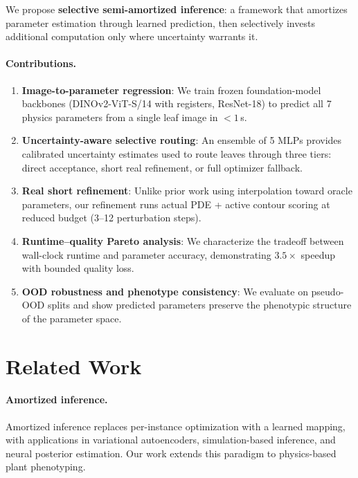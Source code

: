 \documentclass[11pt,a4paper]{article}
\begin{document}
We propose \textbf{selective semi-amortized inference}:
a framework that amortizes parameter estimation through learned prediction,
then selectively invests additional computation only where uncertainty warrants it.

\paragraph{Contributions.}
\begin{enumerate}
\item \textbf{Image-to-parameter regression}: We train frozen foundation-model
  backbones (DINOv2-ViT-S/14 with registers, ResNet-18) to predict all 7 physics
  parameters from a single leaf image in $<1$\,s.

\item \textbf{Uncertainty-aware selective routing}: An ensemble of 5 MLPs provides
  calibrated uncertainty estimates used to route leaves through three tiers:
  direct acceptance, short real refinement, or full optimizer fallback.

\item \textbf{Real short refinement}: Unlike prior work using interpolation toward
  oracle parameters, our refinement runs actual PDE + active contour scoring
  at reduced budget (3--12 perturbation steps).

\item \textbf{Runtime--quality Pareto analysis}: We characterize the tradeoff
  between wall-clock runtime and parameter accuracy, demonstrating $3.5\times$
  speedup with bounded quality loss.

\item \textbf{OOD robustness and phenotype consistency}: We evaluate on
  pseudo-OOD splits and show predicted parameters preserve the phenotypic
  structure of the parameter space.
\end{enumerate}

\section{Related Work}
\label{sec:related}

\paragraph{Amortized inference.}
Amortized inference replaces per-instance optimization with a learned mapping,
with applications in variational autoencoders, simulation-based inference,
and neural posterior estimation.
Our work extends this paradigm to physics-based plant phenotyping.
\end{document}
